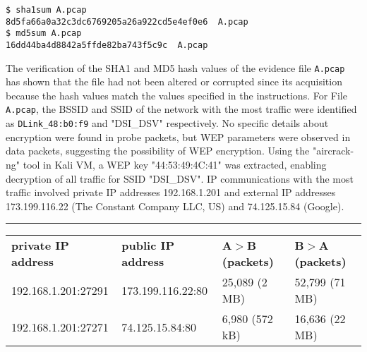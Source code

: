 \begin{verbatim}
$ sha1sum A.pcap             
8d5fa66a0a32c3dc6769205a26a922cd5e4ef0e6  A.pcap
$ md5sum A.pcap 
16dd44ba4d8842a5ffde82ba743f5c9c  A.pcap
\end{verbatim}
The verification of the SHA1 and MD5 hash values of the evidence file \texttt{A.pcap} has shown that the file had not been altered or corrupted since its acquisition because the hash values match the values specified in the instructions. For File \texttt{A.pcap}, the BSSID and SSID of the network with the most traffic were identified as \texttt{DLink\_48:b0:f9} and "DSI\_DSV" respectively. No specific details about encryption were found in probe packets, but WEP parameters were observed in data packets, suggesting the possibility of WEP encryption. Using the "aircrack-ng" tool in Kali VM, a WEP key "44:53:49:4C:41" was extracted, enabling decryption of all traffic for SSID "DSI\_DSV". IP communications with the most traffic involved private IP addresses 192.168.1.201 and external IP addresses 173.199.116.22 (The Constant Company LLC, US) and 74.125.15.84 (Google).

\noindent\rule{\textwidth}{1pt}
\vspace{-0.8cm}
\begin{table}[h]
\begin{tabular}{llll}
\textbf{private IP address} & \textbf{public IP address} & \textbf{A$>$B (packets)} & \textbf{B$>$A (packets)}\\
192.168.1.201:27291      & 173.199.116.22:80 & 25,089 (2 MB) & 52,799 (71 MB)\\
192.168.1.201:27271      & 74.125.15.84:80 & 6,980 (572 kB) & 16,636 (22 MB)
\end{tabular}
\end{table}

